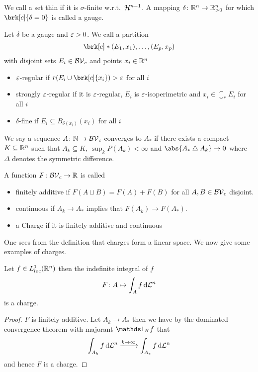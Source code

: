 \begin{definition}[Gauge]
We call a set thin if it is $\sigma$-finite w.r.t.\ $\mathcal{H}^{n-1}$. A mapping $\delta\colon\mathbb{R}^n\to\mathbb{R}^n_{>0}$ for which $\brk[c]{\delta=0}$ is called a gauge.
\end{definition}

\begin{definition}[Partitions]
Let $\delta$ be a gauge and $\varepsilon>0$.
We call a partition
\begin{align*}
	\brk[c]*{(E_1,x_1),\dots, (E_p,x_p)}
\end{align*}
with disjoint sets $E_i\in\mathcal{BV}_c$ and points $x_i\in\mathbb{R}^n$
\begin{itemize}
	\item $\varepsilon$-regular if $r(E_i\cup\brk[c]{x_i})>\e$ for all $i$
	\item strongly $\varepsilon$-regular if it is $\varepsilon$-regular, $E_i$ is $\varepsilon$-isoperimetric and $x_i\in\closure_*E_i$ for all $i$
	\item $\delta$-fine if $E_i\subseteq B_{\delta(x_i)}(x_i)$ for all $i$
\end{itemize}
\end{definition}

\begin{definition}[Topology on $\BV_c$]
We say a sequence $A\colon\mathbb{N}\to \mathcal{BV}_c$ converges to $A_*$ if there exists a compact $K\subseteq\mathbb{R}^n$ such that $A_k\subseteq K$, $\sup_kP(A_k)<\infty$ and $\abs{A_*\symmDiff A_k}\to0$ where $\Delta$ denotes the symmetric difference.
\end{definition}

\begin{definition}[Charge]
A function $F\colon \mathcal{BV}_c\to\mathbb{R}$ is called
\begin{itemize}
	\item finitely additive if $F(A\sqcup B) =F(A)+F(B)$ for all $A,B\in\mathcal{BV}_c$ disjoint.
	\item continuous if $A_k\to A_*$ implies that $F(A_k)\to F(A_*)$.
	\item a Charge if it is finitely additive and continuous
\end{itemize}
\end{definition}

One sees from the definition that charges form a linear space.
We now give some examples of charges.

\begin{claim}
Let $f\in L^1_{loc}(\mathbb{R}^n)$ then the indefinite integral of $f$
\begin{align*}
	F\colon A\mapsto \int_Af\,\mathrm{d} \mathcal{L}^n
\end{align*}
is a charge.
\end{claim}
\begin{proof}
$F$ is finitely additive. Let $A_k\to A_*$ then we have by the dominated convergence theorem with majorant $\one_Kf$ that
\begin{align*}
	\int_{A_k}f\,\mathrm{d} \mathcal{L}^n\xrightarrow{k\to\infty}\int_{A_*}f\,\mathrm{d} \mathcal{L}^n
\end{align*}
and hence $F$ is a charge.
\end{proof}

